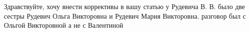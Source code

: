  
 
 
 
 

\qqSecCmt


Здравствуйте, хочу внести коррективы в вашу статью у Рудевича В. В. было две
сестры Рудевич Ольга Викторовна и Рудевич Мария Викторовна. разговор был с
Ольгой Викторовной а не с Валентиной
